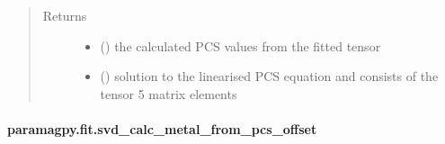 \documentclass[a4paper,10pt,english,openany,oneside]{sphinxmanual}
\begin{document}
\begin{fulllineitems}
\begin{quote}
\begin{description}
\begin{itemize}
\end{itemize}

\item[{Returns}] \leavevmode
\begin{itemize}
\item {} 
 () \textendash{} the calculated PCS values from the fitted tensor

\item {} 
 () \textendash{} solution to the linearised PCS equation and
consists of the tensor 5 matrix elements

\end{itemize}


\end{description}\end{quote}

\end{fulllineitems}



\paragraph{paramagpy.fit.svd\_calc\_metal\_from\_pcs\_offset}
\label{\detokenize{reference/generated/paramagpy.fit.svd_calc_metal_from_pcs_offset:paramagpy-fit-svd-calc-metal-from-pcs-offset}}\label{\detokenize{reference/generated/paramagpy.fit.svd_calc_metal_from_pcs_offset::doc}}
\end{document}
